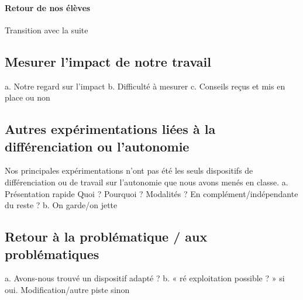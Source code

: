 \paragraph*{Retour de nos élèves}
Transition avec la suite
\subsection{Mesurer l’impact de notre travail}
a.	Notre regard sur l’impact
b.	Difficulté à mesurer
c.	Conseils reçus et mis en place ou non
\subsection{Autres expérimentations liées à la différenciation ou l’autonomie}
Nos principales expérimentations n'ont pas été les seuls dispositifs de différenciation ou de travail sur l'autonomie que nous avons menés en classe.
a.	Présentation rapide
Quoi ? Pourquoi ? Modalités ? En complément/indépendante du reste ?
b.	On garde/on jette
\subsection{Retour à la problématique / aux problématiques}
a.	Avons-nous trouvé un dispositif adapté ?
b.	« ré exploitation possible ? » si oui. Modification/autre piste sinon 
